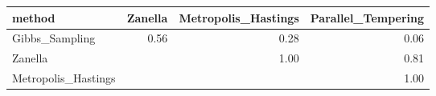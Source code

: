 \begin{table}[ht]
\centering
\begin{tabular}{lrrr}
  \hline
method & Zanella & Metropolis\_Hastings & Parallel\_Tempering \\ 
  \hline
Gibbs\_Sampling & 0.56 & 0.28 & 0.06 \\ 
  Zanella &  & 1.00 & 0.81 \\ 
  Metropolis\_Hastings &  &  & 1.00 \\ 
   \hline
\end{tabular}
\end{table}
